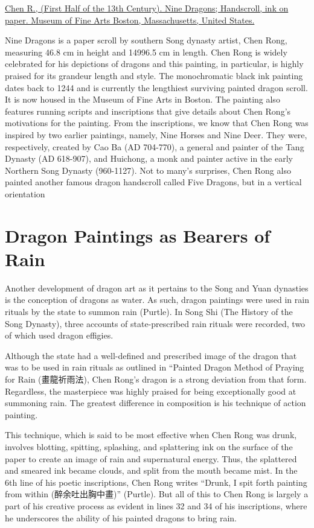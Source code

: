 \documentclass[
]{book}
\begin{document}
\href{https://collections.mfa.org/objects/28526}{Chen R., (First Half of the 13th Century). Nine Dragons; Handscroll, ink on paper. Museum of Fine Arts Boston, Massachusetts, United States.}

Nine Dragons is a paper scroll by southern Song dynasty artist, Chen Rong, measuring 46.8 cm in height and 14996.5 cm in length. Chen Rong is widely celebrated for his depictions of dragons and this painting, in particular, is highly praised for its grandeur length and style. The monochromatic black ink painting dates back to 1244 and is currently the lengthiest surviving painted dragon scroll. It is now housed in the Museum of Fine Arts in Boston.
The painting also features running scripts and inscriptions that give details about Chen Rong's motivations for the painting. From the inscriptions, we know that Chen Rong was inspired by two earlier paintings, namely, Nine Horses and Nine Deer. They were, respectively, created by Cao Ba (AD 704-770), a general and painter of the Tang Dynasty (AD 618-907), and Huichong, a monk and painter active in the early Northern Song Dynasty (960-1127). Not to many's surprises, Chen Rong also painted another famous dragon handscroll called Five Dragons, but in a vertical orientation

\hypertarget{dragon-paintings-as-bearers-of-rain}{%
\section*{Dragon Paintings as Bearers of Rain}\label{dragon-paintings-as-bearers-of-rain}}

Another development of dragon art as it pertains to the Song and Yuan dynasties is the conception of dragons as water. As such, dragon paintings were used in rain rituals by the state to summon rain (Purtle). In Song Shi (The History of the Song Dynasty), three accounts of state-prescribed rain rituals were recorded, two of which used dragon effigies.

Although the state had a well-defined and prescribed image of the dragon that was to be used in rain rituals as outlined in ``Painted Dragon Method of Praying for Rain (畫龍祈雨法), Chen Rong's dragon is a strong deviation from that form. Regardless, the masterpiece was highly praised for being exceptionally good at summoning rain. The greatest difference in composition is his technique of action painting.

This technique, which is said to be most effective when Chen Rong was drunk, involves blotting, spitting, splashing, and splattering ink on the surface of the paper to create an image of rain and supernatural energy. Thus, the splattered and smeared ink became clouds, and split from the mouth became mist. In the 6th line of his poetic inscriptions, Chen Rong writes ``Drunk, I spit forth painting from within (醉余吐出胸中畫)'' (Purtle). But all of this to Chen Rong is largely a part of his creative process as evident in lines 32 and 34 of his inscriptions, where he underscores the ability of his painted dragons to bring rain.
\end{document}
